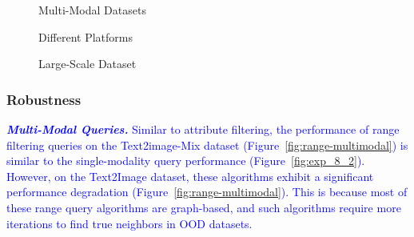 \documentclass[sigconf, nonacm]{acmart}
\begin{document}
{\begin{figure}
\begin{minipage}[t]{0.203\textwidth}
	\end{minipage}
	
\end{figure}

\begin{figure}
	\centering
	\setlength{\abovecaptionskip}{0.0cm}
	\begin{minipage}[t]{0.37\textwidth}
		\centering
		\caption{Multi-Modal Datasets}
		\label{fig:range-multimodal} 
	\end{minipage}%
	\hfill %
	\begin{minipage}[t]{0.37\textwidth}
		\centering
		\caption{Different Platforms}
		\label{fig:range-cross-platform}
	\end{minipage}%
	\hfill
	\begin{minipage}[t]{0.24\textwidth}
		\centering
		\caption{Large-Scale Dataset}
		\label{fig: range big dataset}
	\end{minipage}
\end{figure}
	
	\subsubsection{Robustness}
	
	\textit{\textbf{\textcolor{blue}{Multi-Modal Queries.}}}
	\textcolor{blue}{
		Similar to attribute filtering, the performance of range filtering queries on the Text2image-Mix dataset (Figure~\ref{fig:range-multimodal}) is similar to the single-modality query performance (Figure~\ref{fig:exp_8_2}). However, on the Text2Image dataset, these algorithms exhibit a significant performance degradation (Figure~\ref{fig:range-multimodal}). This is because most of these range query algorithms are graph-based, and such algorithms require more iterations to find true neighbors in OOD datasets.
		}
		
}
\end{document}
